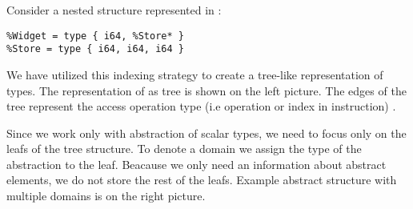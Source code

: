 \begin{example} \label{ex:fieldtrie}
Consider a nested structure represented in \LLVMIR:
\begin{verbatim}
%Widget = type { i64, %Store* }
%Store = type { i64, i64, i64 }
\end{verbatim}

We have utilized this indexing strategy to create a tree-like representation
of types. The representation of  as tree is shown on the
left picture. The edges of the tree represent the access operation type
(i.e  operation or index in  instruction)
\cite{LLVM:langref}.

Since we work only with abstraction of scalar types, we need to focus only on
the leafs of the tree structure. To denote a domain we assign the type of the
abstraction to the leaf. Beacause we only need an information about abstract
elements, we do not store the rest of the leafs. Example abstract structure
with multiple domains is on the right picture.


\end{example}
